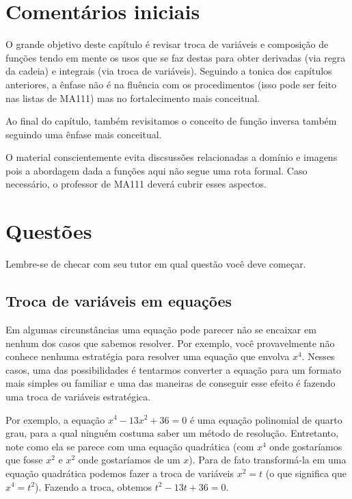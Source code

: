 \documentclass[main.tex]{subfiles}
\begin{document}
\section{Comentários iniciais}

O grande objetivo deste capítulo é revisar troca de variáveis e composição de funções tendo em mente os usos que se faz destas para obter derivadas (via regra da cadeia) e integrais (via troca de variáveis). Seguindo a tonica dos capítulos anteriores, a ênfase não é na fluência com os procedimentos (isso pode ser feito nas listas de MA111) mas no fortalecimento mais conceitual.

Ao final do capítulo, também revisitamos o conceito de função inversa também seguindo uma ênfase mais conceitual.

O material conscientemente evita discsussões relacionadas a domínio e imagens pois a abordagem dada a funções aqui não segue uma rota formal. Caso necessário, o professor de MA111 deverá cubrir esses aspectos.

\paraAmbos

\newpage

\section{Questões}

Lembre-se de checar com seu tutor em qual questão você deve começar.

\subsection*{Troca de variáveis em equações}

Em algumas circunstâncias uma equação pode parecer não se encaixar em nenhum dos casos que sabemos resolver. Por exemplo, você provavelmente não conhece nenhuma estratégia para resolver uma equação que envolva $x^4$. Nesses casos, uma das possibilidades é tentarmos converter a equação para um formato mais simples ou familiar e uma das maneiras de conseguir esse efeito é fazendo uma troca de variáveis estratégica.

Por exemplo, a equação $x^4-13x^2+36=0$ é uma equação polinomial de quarto grau, para a qual ninguém costuma saber um método de resolução. Entretanto, note como ela se parece com uma equação quadrática (com $x^4$ onde gostaríamos que fosse $x^2$ e $x^2$ onde gostaríamos de um $x$). Para de fato transformá-la em uma equação quadrática podemos fazer a troca de variáveis $x^2=t$ (o que significa que $x^4=t^2$). Fazendo a troca, obtemos $t^2-13t+36=0$.
\end{document}
